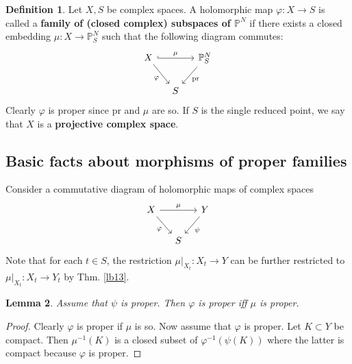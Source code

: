 \documentclass[12pt,b5paper,notitlepage]{report}
\theoremstyle{definition}
\newtheorem{df}{Definition}[section]
\theoremstyle{plain}
\newtheorem{lm}[df]{Lemma}
\newcommand{\scr}{\mathscr}
\newcommand{\Pbb}{\mathbb P}
\newcommand{\pr}{\mathrm {pr}}
\newcommand{\Specan}{\mathrm{Specan}}
\newcommand{\mk}{\mathfrak m}
\numberwithin{equation}{section}
\begin{document}
\begin{df}
Let $X,S$ be complex spaces. A  holomorphic map $\varphi:X\rightarrow S$ is called a \textbf{family of (closed complex) subspaces of $\Pbb^N$}  if there exists a closed embedding $\mu:X\rightarrow \Pbb^N_S$ such that the following diagram commutes:
\begin{equation}\label{eq206}
\begin{tikzcd}[column sep=small]
X \arrow[rr,hook,"\mu"] \arrow[rd,"\varphi"'] &   & \Pbb^N_S \arrow[ld,"\pr"] \\
                        & S &             
\end{tikzcd}
\end{equation}
Clearly $\varphi$ is proper since $\pr$ and $\mu$ are so. If $S$ is the single reduced point, we say that $X$ is a \textbf{projective complex space}.
\end{df}



\subsection{Basic facts about morphisms of proper families}


Consider a commutative diagram of holomorphic maps of complex spaces 
\begin{equation}\label{eq205}
\begin{tikzcd}[column sep=small]
X \arrow[rr,"\mu"] \arrow[rd,"\varphi"'] &   & Y \arrow[ld,"\psi"] \\
                        & S &             
\end{tikzcd}
\end{equation}
Note that for each $t\in S$, the restriction $\mu|_{X_t}:X_t\rightarrow Y$ can be further restricted to $\mu|_{X_t}:X_t\rightarrow Y_t$ by Thm. \ref{lb13}.





\begin{lm}\label{lb394}
Assume that $\psi$ is proper. Then $\varphi$ is proper iff $\mu$ is proper.
\end{lm}


\begin{proof}
Clearly $\varphi$ is proper if $\mu$ is so. Now assume that $\varphi$ is proper. Let $K\subset Y$ be compact. Then $\mu^{-1}(K)$ is a closed subset of $\varphi^{-1}(\psi(K))$ where the latter is compact because $\varphi$ is proper.
\end{proof}
\end{document}
